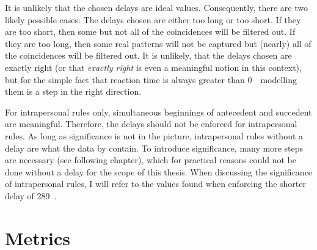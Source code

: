 It is unlikely that the chosen delays are ideal values.
Consequently, there are two likely possible cases:
The delays chosen are either too long or too short.
If they are too short, then some but not all of the coincidences will be filtered out.
If they are too long, then some real patterns will not be captured but (nearly) all of the coincidences will be filtered out.
It is unlikely, that the delays chosen are exactly right (or that \emph{exactly right} is even a meaningful notion in this context), but for the simple fact that reaction time is always greater than 0~\ms\ modelling them is a step in the right direction.

For intrapersonal rules only, simultaneous beginnings of antecedent and succedent are meaningful.
Therefore, the delays should not be enforced for intrapersonal rules.
As long as significance is not in the picture, intrapersonal rules without a delay are what the data by \citet{rohlfing_multimodal_underreview} contain.
To introduce significance, many more steps are necessary (see following chapter), which for practical reasons could not be done without a delay for the scope of this thesis.
When discussing the significance of intrapersonal rules, I will refer to the values found when enforcing the shorter delay of 289~\ms.


\section{Metrics}
\label{sec:fpmmetr}
